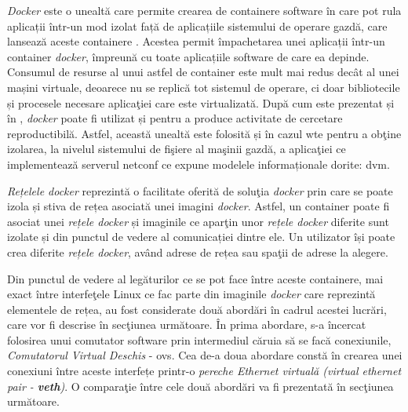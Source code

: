 \textit{Docker} este o unealtă care permite crearea de containere software în care pot rula aplicații într-un mod izolat față de aplicațiile sistemului de operare gazdă, care lansează aceste containere \cite{merkel2014docker}. Acestea permit împachetarea unei aplicații într-un container \textit{docker}, împreună cu toate aplicațiile software de care ea depinde. Consumul de resurse al unui astfel de container este mult mai redus decât al unei mașini virtuale, deoarece nu se replică tot sistemul de operare, ci doar bibliotecile și procesele necesare aplicaţiei care este virtualizată. După cum este prezentat și în \cite{chamberlain2014using}, \textit{docker} poate fi utilizat și pentru a produce activitate de cercetare reproductibilă. Astfel, această unealtă este folosită și în cazul \gls{wte} pentru a obţine izolarea, la nivelul sistemului de fişiere al maşinii gazdă, a aplicaţiei ce implementează serverul \gls{netconf} ce expune modelele informaționale dorite: \gls{dvm}.

\textit{Rețelele docker} reprezintă o facilitate oferită de soluţia \textit{docker} prin care se poate izola și stiva de rețea asociată unei imagini \textit{docker}. Astfel, un container poate fi asociat unei \textit{rețele docker} și imaginile ce aparţin unor \textit{rețele docker} diferite sunt izolate și din punctul de vedere al comunicației dintre ele. Un utilizator își poate crea diferite \textit{rețele docker}, având adrese de rețea sau spaţii de adrese la alegere.

Din punctul de vedere al legăturilor ce se pot face între aceste containere, mai exact între interfeţele Linux ce fac parte din imaginile \textit{docker} care reprezintă elementele de rețea, au fost considerate două abordări în cadrul acestei lucrări, care vor fi descrise în secţiunea următoare. În prima abordare, s-a încercat folosirea unui comutator software prin intermediul căruia să se facă conexiunile, \textit{Comutatorul Virtual Deschis} - \gls{ovs}. Cea de-a doua abordare constă în crearea unei conexiuni între aceste interfețe printr-o \textit{pereche Ethernet virtuală (virtual ethernet pair - \textbf{veth})}. O comparaţie între cele două abordări va fi prezentată în secţiunea următoare.


